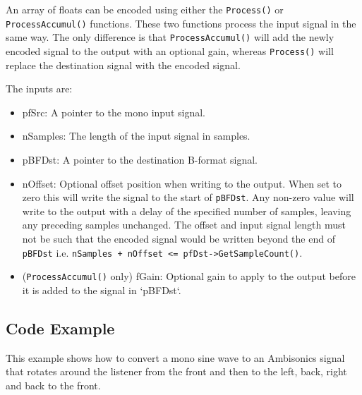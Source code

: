 \documentclass[12pt]{report}
\newcommand{\code}[1]{\texttt{#1}}
\begin{document}
An array of floats can be encoded using either the \code{Process()} or \code{ProcessAccumul()} functions. These two functions process the input signal in the same way. The only difference is that \code{ProcessAccumul()} will add the newly encoded signal to the output with an optional gain, whereas \code{Process()} will replace the destination signal with the encoded signal.

The inputs are:
\begin{itemize}
    \item pfSrc: A pointer to the mono input signal.
    \item nSamples: The length of the input signal in samples.
    \item pBFDst: A pointer to the destination B-format signal.
    \item nOffset: Optional offset position when writing to the output. When set to zero this will write the signal to the start of \code{pBFDst}. Any non-zero value will write to the output with a delay of the specified number of samples, leaving any preceding samples unchanged. The offset and input signal length must not be such that the encoded signal would be written beyond the end of \code{pBFDst} i.e. \code{nSamples + nOffset <= pfDst->GetSampleCount()}.
    \item (\code{ProcessAccumul()} only) fGain: Optional gain to apply to the output before it is added to the signal in `pBFDst`.
\end{itemize}

\subsection{Code Example}

This example shows how to convert a mono sine wave to an Ambisonics signal that rotates around the listener from the front and then to the left, back, right and back to the front.
\end{document}
